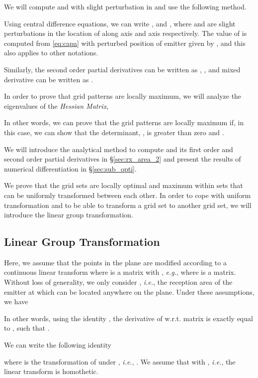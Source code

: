 \documentclass[12pt,english]{article}
\begin{document}
We will compute  and  with slight perturbation in  and use the following method. 

Using central difference equations, we can write
,
and
,
where  and  are slight perturbations in the location of  along axis and axis respectively. The value of  is computed from \eqref{eq:capa} with perturbed position of emitter  given by , and this also applies to other notations.

Similarly, the second order partial derivatives can be written as
,
,
and mixed derivative can be written as
. 

In order to prove that grid patterns are locally maximum, we will analyze the eigenvalues of the  {\em Hessian Matrix},

In other words, we can prove that the grid patterns are locally maximum if, in this case, we can show that the determinant, , is greater than zero and \mbox{}. 

We will introduce the analytical method to compute  and its first order and second order partial derivatives in \S \ref{sec:rx_area_2} and present the results of numerical differentiation in \S \ref{sec:sub_opti}. 

We prove that the grid sets are locally optimal and maximum within sets that can be uniformly transformed between each other. In order to cope with uniform transformation and to be able to transform a grid set to another grid set, we will introduce the linear group transformation. 

\subsection{Linear Group Transformation}

Here, we assume that the points in the plane are modified according to a continuous linear transform  where  is a matrix with \mbox{}, {\it e.g.}, \mbox{} where  is a matrix. Without loss of generality, we only consider , {\it i.e.}, the reception area of the emitter at  which can be located anywhere on the plane. Under these assumptions, we have


In other words, using the identity \mbox{}, the derivative of  w.r.t. matrix  is exactly equal to \mbox{}, 
such that
. 

We can write the following identity

where  is the transformation of  under , {\it i.e.}, \mbox{}. We assume that {} with \mbox{}, {\it i.e.}, the linear transform is homothetic.
\end{document}
